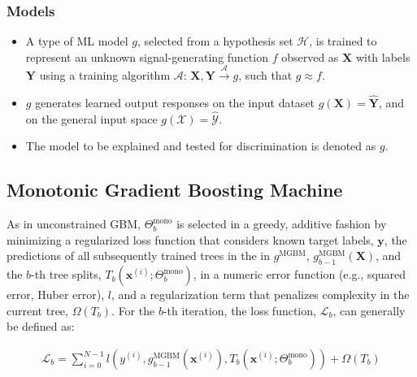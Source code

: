 \documentclass[information,article,submit,moreauthors,pdftex]{definitions/mdpi}
\begin{document}
\subsubsection{Models}

\begin{itemize}[leftmargin=*,labelsep=5.8mm]
	\item A type of ML model $g$, selected from a hypothesis set $\mathcal{H}$, is trained to represent an unknown signal-generating function $f$ observed as  $\mathbf{X}$ with labels $\mathbf{Y}$ using a training algorithm $\mathcal{A}$: 
	$ \mathbf{X}, \mathbf{Y} \xrightarrow{\mathcal{A}} g$, such that $g \approx f$.
	\item $g$ generates learned output responses on the input dataset $g(\mathbf{X}) = \mathbf{\hat{Y}}$, and on the general input space $g(\mathcal{X}) = \mathcal{\hat{Y}}$.
	\item The model to be explained and tested for discrimination is denoted as $g$.
\end{itemize}

\subsection{Monotonic Gradient Boosting Machine}\label{a_ssec:mgbm}

\noindent As in unconstrained GBM, $\Theta^{\text{mono}}_b$ is selected in a greedy, additive fashion by minimizing a regularized loss function that considers known target labels, $\mathbf{y}$, the predictions of all subsequently trained trees in the in $g^{\text{MGBM}}$, $g^{\text{MGBM}}_{b-1}(\mathbf{X})$, and the $b$-th tree splits, $T_b(\mathbf{x}^{(i)};\Theta^\text{mono}_b)$, in a numeric error function (e.g., squared error, Huber error), $l$, and a regularization term that penalizes complexity in the current tree, $\Omega(T_b)$. For the $b$-th iteration, the loss function, $\mathcal{L}_{b}$, can generally be defined as:

\begin{equation}
\begin{aligned}
\mathcal{L}_{b} =\sum_{i=0}^{N-1}l(y^{(i)}, g^{\text{MGBM}}_{b-1}(\mathbf{x}^{(i)}), T_b(\mathbf{x}^{(i)};\Theta^\text{mono}_b)) + \Omega(T_b)\\
\end{aligned}
\end{equation}
\end{document}
